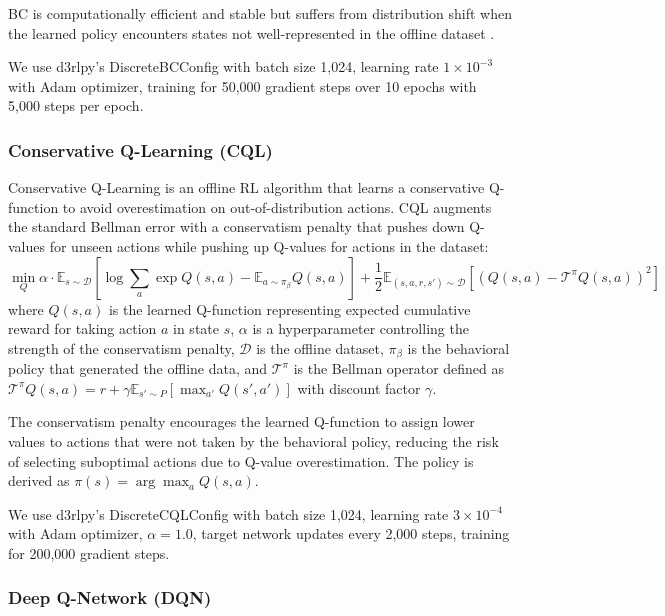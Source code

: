 BC is computationally efficient and stable but suffers from distribution shift when the learned policy encounters states not well-represented in the offline dataset \citep{ross2010dagger}.

We use d3rlpy's DiscreteBCConfig with batch size 1,024, learning rate $1 \times 10^{-3}$ with Adam optimizer, training for 50,000 gradient steps over 10 epochs with 5,000 steps per epoch.

\subsubsection{Conservative Q-Learning (CQL)}

Conservative Q-Learning \citep{kumar2020cql} is an offline RL algorithm that learns a conservative Q-function to avoid overestimation on out-of-distribution actions. CQL augments the standard Bellman error with a conservatism penalty that pushes down Q-values for unseen actions while pushing up Q-values for actions in the dataset:
\begin{equation}
\min_Q \alpha \cdot \mathbb{E}_{s \sim \mathcal{D}} \left[ \log \sum_a \exp Q(s, a) - \mathbb{E}_{a \sim \pi_\beta} Q(s, a) \right] + \frac{1}{2} \mathbb{E}_{(s,a,r,s') \sim \mathcal{D}} \left[ (Q(s,a) - \mathcal{T}^\pi Q(s,a))^2 \right]
\label{eq:cql}
\end{equation}
where $Q(s,a)$ is the learned Q-function representing expected cumulative reward for taking action $a$ in state $s$, $\alpha$ is a hyperparameter controlling the strength of the conservatism penalty, $\mathcal{D}$ is the offline dataset, $\pi_\beta$ is the behavioral policy that generated the offline data, and $\mathcal{T}^\pi$ is the Bellman operator defined as $\mathcal{T}^\pi Q(s,a) = r + \gamma \mathbb{E}_{s' \sim P}[\max_{a'} Q(s', a')]$ with discount factor $\gamma$.

The conservatism penalty encourages the learned Q-function to assign lower values to actions that were not taken by the behavioral policy, reducing the risk of selecting suboptimal actions due to Q-value overestimation. The policy is derived as $\pi(s) = \arg\max_a Q(s, a)$.

We use d3rlpy's DiscreteCQLConfig with batch size 1,024, learning rate $3 \times 10^{-4}$ with Adam optimizer, $\alpha = 1.0$, target network updates every 2,000 steps, training for 200,000 gradient steps.

\subsubsection{Deep Q-Network (DQN)}

